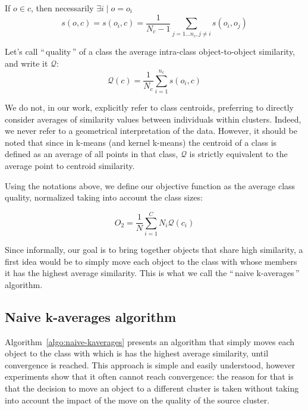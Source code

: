 \documentclass[a4paper,twoside]{article}
\newcommand{\gl}[1]{``\,#1\,''} %
\begin{document}
If $o \in c$, then necessarily $\exists i \mid o = o_i$
\begin{equation}
  s\left(o,c\right) = s\left(o_i, c\right) = \frac{1}{N_c-1} \sum_{j=1 \ldots n_c, j \neq i} s\left(o_i, o_j\right)
  	 \label{eq:soc_inclass}
\end{equation}

Let's call \gl{quality} of a class the average intra-class object-to-object similarity, and write it $\mathcal{Q}$:
\begin{equation}
\mathcal{Q}\left(c\right) = \frac{1}{N_c} \sum_{i=1}^{n_c} s\left(o_i, c\right)
\end{equation}

We do not, in our work, explicitly refer to class centroids, preferring to directly consider averages of similarity values between individuals within clusters. Indeed, we never refer to a geometrical interpretation of the data. However, it should be noted that since in k-means (and kernel k-means) the centroid of a class is defined as an average of all points in that class, $\mathcal{Q}$ is strictly equivalent to the average point to centroid similarity.

Using the notations above, we define our objective function as the average class quality, normalized taking into account the class sizes:

\[
O_2 = \frac{1}{N} \sum_{i=1}^{C} N_i \mathcal{Q}(c_i)
\]

Since informally, our goal is to bring together objects that share high similarity, a first idea would be to simply move each object to the class with whose members it has the highest average similarity. This is what we call the \gl{naive k-averages} algorithm.

\subsection{Naive k-averages algorithm}

Algorithm~\ref{algo:naive-kaverages} presents an algorithm that simply moves each object to the class with which is has the highest average similarity, until convergence is reached. This approach is simple and easily understood, however experiments show that it often cannot reach convergence: the reason for that is that the decision to move an object to a different cluster is taken without taking into account the impact of the move on the quality of the source cluster.
\end{document}
